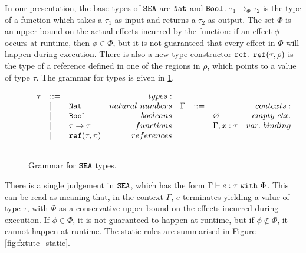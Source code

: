 In our presentation, the base types of $\mathtt{SEA}$ are $\mathtt{Nat}$ and $\mathtt{Bool}$. $\tau_1 \rightarrow_{\Phi} \tau_2$ is the type of a function which takes a $\tau_1$ as input and returns a $\tau_2$ as output. The set $\Phi$ is an upper-bound on the actual effects incurred by the function: if an effect $\phi$ occurs at runtime, then $\phi \in \Phi$, but it is not guaranteed that every effect in $\Phi$ will happen during execution. There is also a new type constructor $\mathtt{ref}$. $\mathtt{ref}(\tau, \rho)$ is the type of a reference defined in one of the regions in $\rho$, which points to a value of type $\tau$. The grammar for types is given in \ref{fig:fxtute_types}.

\begin{figure}[h]

\[
\begin{array}{c}

\begin{array}{lllr}

\tau & ::= & ~ & types: \\
	& | & \mathtt{Nat} & natural~numbers \\
	& | & \mathtt{Bool} & booleans \\
	& | & \tau \rightarrow \tau & functions \\
	& | & \mathtt{ref}(\tau, \pi) & references \\
	&&\\

\end{array}

\begin{array}{lllr}
	
\Gamma & ::= & ~ & contexts: \\
	& | & \varnothing & empty~ctx. \\
	& | & \Gamma, x: \tau & var.~binding \\
	&&\\
\end{array}

\end{array}
\]

\vspace{-12pt}
\caption{Grammar for $\mathtt{SEA}$ types.}
\label{fig:fxtute_types}
\end{figure}

There is a single judgement in $\mathtt{SEA}$, which has the form $\Gamma \vdash e: \tau~\mathtt{with}~ \Phi$. This can be read as meaning that, in the context $\Gamma$, $e$ terminates yielding a value of type $\tau$, with $\Phi$ as a conservative upper-bound on the effects incurred during execution. If $\phi \in \Phi$, it is not guaranteed to happen at runtime, but if $\phi \notin \Phi$, it cannot happen at runtime. The static rules are summarised in Figure \ref{fig:fxtute_static}.

